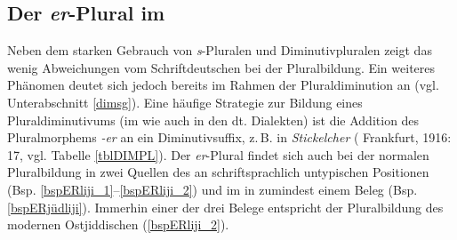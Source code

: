
 \FloatBarrier

\subsection{Der \textit{er}-Plural im }\label{erPLURAL}
Neben dem starken Gebrauch von \textit{s}-Pluralen und Diminutivpluralen zeigt das  wenig Abweichungen vom Schriftdeutschen bei der Pluralbildung. Ein weiteres Phänomen deutet sich jedoch bereits im Rahmen der Pluraldiminution an (vgl. Unterabschnitt \ref{dimsg}). Eine häufige Strategie zur Bildung eines Pluraldiminutivums (im  wie auch in den dt. Dialekten) ist die Addition des Pluralmorphems \textit{-er} an ein Diminutivsuffix, z.\,B. in \textit{Stickelcher}  ( Frankfurt, 1916:\,17, vgl. Tabelle \ref{tblDIMPL}). Der \textit{er}-Plural findet sich auch bei der normalen Pluralbildung in zwei Quellen des  an schriftsprachlich untypischen Positionen (Bsp. \ref{bspERliji_1}--\ref{bspERliji_2}) und im  in zumindest einem Beleg (Bsp. \ref{bspERjüdliji}). Immerhin einer der drei Belege entspricht der Pluralbildung des modernen Ostjiddischen (\ref{bspERliji_2}). 

